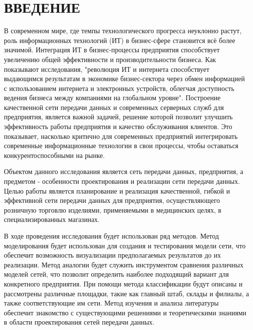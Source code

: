 \documentclass[14pt, a4paper]{extarticle}
\numberwithin{equation}{section}
\begin{document}

\pretocmd{\section}{\newpage}{}{}

\def\contentsname{СОДЕРЖАНИЕ}

\begin{titlepage}

\end{titlepage}
\tableofcontents

\section*{ВВЕДЕНИЕ}
\setcounter{page}{4}

В современном мире, где темпы технологического прогресса 
неуклонно растут,  роль информационных технологий (ИТ) в 
бизнес-сфере становится всё более значимой. 
Интеграция ИТ в бизнес-процессы предприятия способствует 
увеличению общей эффективности и производительности бизнеса. 
Как показывают исследования, "революция ИТ и интернета 
способствует выдающимся результатам в экономике 
бизнес-сектора через обмен информацией с использованием 
интернета и электронных устройств, 
облегчая доступность ведения бизнеса между компаниями на 
глобальном уровне"\cite{mgunda2019impacts}.
Построение качественной сети передачи данных и современных 
серверных служб для предприятия, 
является важной задачей, решение которой позволит улучшить 
эффективность работы предприятия 
и качество обслуживания клиентов.
Это показывает, насколько критично для современных 
предприятий интегрировать современные информационные 
технологии в свои процессы, чтобы оставаться 
конкурентоспособными на рынке.

Объектом данного исследования является сеть передачи данных, предприятия, 
а предметом - особенности проектирования и реализации сети передачи данных. 
Целью работы является планирование и реализация качественной, гибкой и 
эффективной сети передачи данных для предприятия, осуществляющего розничную 
торговлю изделиями, применяемыми в медицинских целях, в специализированных магазинах.


В ходе проведения исследования будет использован ряд методов. 
Метод моделирования будет использован для создания и тестирования 
модели сети,  что обеспечит возможность визуализации предполагаемых 
результатов до их реализации. Метод аналогии будет служить инструментом 
сравнения различных моделей сетей,  что позволит определить наиболее 
подходящий вариант для конкретного предприятия. При помощи метода 
классификации будут описаны и рассмотрены различные площадки, 
такие как главный штаб, склады и филиалы, а также соответствующие им сети. 
Метод изучения и анализа литературы обеспечит знакомство 
с существующими решениями и теоретическими знаниями в области 
проектирования сетей передачи данных.
\end{document}
